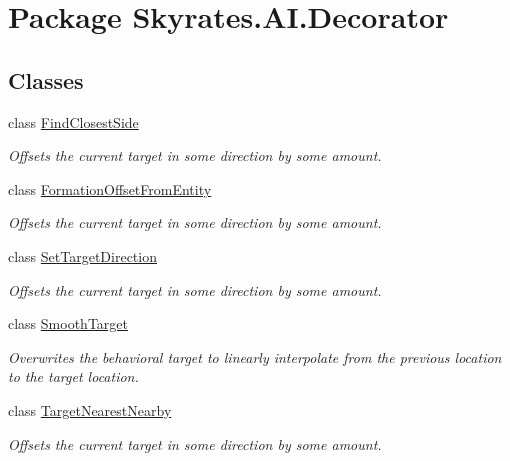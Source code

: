 \hypertarget{namespace_skyrates_1_1_a_i_1_1_decorator}{\section{Package Skyrates.\-A\-I.\-Decorator}
\label{namespace_skyrates_1_1_a_i_1_1_decorator}
}
\subsection*{Classes}
\begin{DoxyCompactItemize}
\item 
class \hyperlink{class_skyrates_1_1_a_i_1_1_decorator_1_1_find_closest_side}{Find\-Closest\-Side}
\begin{DoxyCompactList}\small\item\em Offsets the current target in some direction by some amount. \end{DoxyCompactList}\item 
class \hyperlink{class_skyrates_1_1_a_i_1_1_decorator_1_1_formation_offset_from_entity}{Formation\-Offset\-From\-Entity}
\begin{DoxyCompactList}\small\item\em Offsets the current target in some direction by some amount. \end{DoxyCompactList}\item 
class \hyperlink{class_skyrates_1_1_a_i_1_1_decorator_1_1_set_target_direction}{Set\-Target\-Direction}
\begin{DoxyCompactList}\small\item\em Offsets the current target in some direction by some amount. \end{DoxyCompactList}\item 
class \hyperlink{class_skyrates_1_1_a_i_1_1_decorator_1_1_smooth_target}{Smooth\-Target}
\begin{DoxyCompactList}\small\item\em Overwrites the behavioral target to linearly interpolate from the previous location to the target location. \end{DoxyCompactList}\item 
class \hyperlink{class_skyrates_1_1_a_i_1_1_decorator_1_1_target_nearest_nearby}{Target\-Nearest\-Nearby}
\begin{DoxyCompactList}\small\item\em Offsets the current target in some direction by some amount. \end{DoxyCompactList}\end{DoxyCompactItemize}
